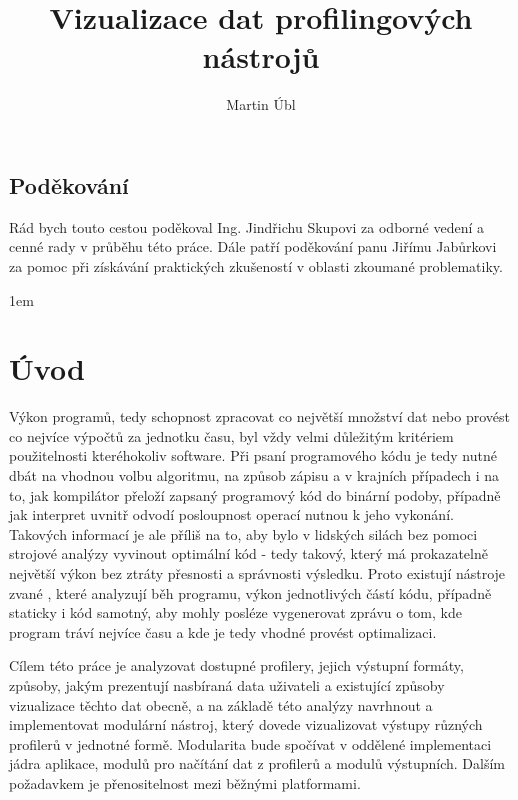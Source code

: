 \documentclass[czech,BP]{thesiskiv}
\author{Martin Úbl}
\title{Vizualizace dat profilingových nástrojů}
\begin{document}
\pagestyle{fancy}

\newcommand{\tick}{\ding{52}}
\newcommand{\tickcross}{\ding{55}}
\renewcommand{\chaptermark}[1]{\markboth{\textit{#1}}{}}
\renewcommand{\sectionmark}[1]{\markright{\textit{#1}}{}}
\cfoot{\thepage}
\lhead{\leftmark}
\rhead{\rightmark}
\maketitle

\thispagestyle{empty}
\section*{Poděkování}
Rád bych touto cestou poděkoval Ing. Jindřichu Skupovi za odborné vedení a cenné rady v průběhu této práce. Dále patří poděkování panu Jiřímu Jabůrkovi za pomoc při získávání praktických zkušeností v oblasti zkoumané problematiky.


\tableofcontents
\pagestyle{fancy}
\renewcommand{\chaptermark}[1]{\markboth{\textit{#1}}{}}
\renewcommand{\sectionmark}[1]{\markright{\textit{#1}}{}}
\cfoot{\thepage}
\lhead{\leftmark}
\rhead{\rightmark}
\parskip 1em

\newpage

\chapter{Úvod}
Výkon programů, tedy schopnost zpracovat co největší množství dat nebo provést co nejvíce výpočtů za jednotku času, byl vždy velmi důležitým kritériem použitelnosti kteréhokoliv software. Při psaní programového kódu je tedy nutné dbát na vhodnou volbu algoritmu, na způsob zápisu a v krajních případech i na to, jak kompilátor přeloží zapsaný programový kód do binární podoby, případně jak interpret uvnitř odvodí posloupnost operací nutnou k jeho vykonání. Takových informací je ale příliš na to, aby bylo v lidských silách bez pomoci strojové analýzy vyvinout optimální kód - tedy takový, který má prokazatelně největší výkon bez ztráty přesnosti a správnosti výsledku. Proto existují nástroje zvané , které analyzují běh programu, výkon jednotlivých částí kódu, případně staticky i kód samotný, aby mohly posléze vygenerovat zprávu o tom, kde program tráví nejvíce času a kde je tedy vhodné provést optimalizaci. 

Cílem této práce je analyzovat dostupné profilery, jejich výstupní formáty, způsoby, jakým prezentují nasbíraná data uživateli a existující způsoby vizualizace těchto dat obecně, a na základě této analýzy navrhnout a implementovat modulární nástroj, který dovede vizualizovat výstupy různých profilerů v jednotné formě. Modularita bude spočívat v oddělené implementaci jádra aplikace, modulů pro načítání dat z profilerů a modulů výstupních. Dalším požadavkem je přenositelnost mezi běžnými platformami.
\end{document}
